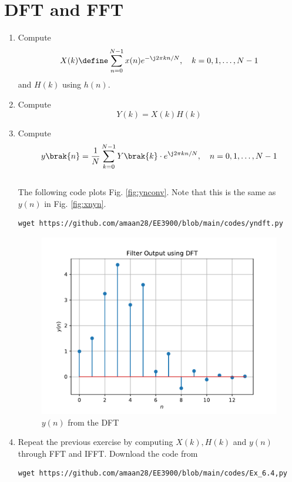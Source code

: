 \documentclass[journal,12pt,twocolumn]{IEEEtran}
\renewcommand\thesection{\arabic{section}}
\begin{document}
\section{DFT and FFT}
\begin{enumerate}[label=\thesection.\arabic*]
\item
Compute
\begin{equation}
X(k) \define \sum _{n=0}^{N-1}x(n) e^{-\j2\pi kn/N}, \quad k = 0,1,\dots, N-1
\end{equation}
and $H(k)$ using $h(n)$.
\item Compute 
\begin{equation}
Y(k) = X(k)H(k)
\end{equation}
\item Compute
\begin{equation}
 y\brak{n}={\frac {1}{N}}\sum _{k=0}^{N-1}Y\brak{k}\cdot e^{\j 2\pi kn/N},\quad n = 0,1,\dots, N-1
\end{equation}
\\
\solution The following code plots Fig. \ref{fig:ynconv}. Note that this is the same as 
$y(n)$ in  Fig. 
\ref{fig:xnyn}. 
%
\begin{lstlisting}
wget https://github.com/amaan28/EE3900/blob/main/codes/yndft.py
\end{lstlisting}
\begin{figure}[!ht]
\centering
\includegraphics[width=\columnwidth]{./figs/yndft}
\caption{$y(n)$ from the DFT}
\label{fig:yndft}
\end{figure}

\item Repeat the previous exercise by computing $X(k), H(k)$ and $y(n)$ through FFT and 
IFFT.
\solution Download the code from
\begin{lstlisting}
wget https://github.com/amaan28/EE3900/blob/main/codes/Ex_6.4,py
\end{lstlisting}


\end{enumerate}
\end{document}
